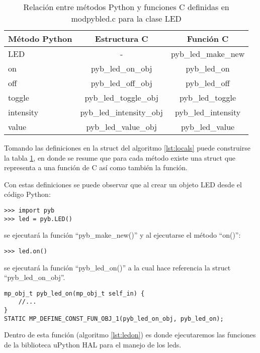 \begin{table}[h]
	\centering
	\caption[]{Relación entre métodos Python y funciones C definidas en modpybled.c para la clase LED}
	\begin{tabular}{l c c}    
		\toprule
		\textbf{Método Python} 	 & \textbf{Estructura C} & \textbf{Función C}  \\
		\midrule
		LED	 				& - 												& pyb\_led\_make\_new \\	
		on	 				& pyb\_led\_on\_obj 				& pyb\_led\_on 					\\		
		off 	 			& pyb\_led\_off\_obj 				& pyb\_led\_off					\\
		toggle	 		& pyb\_led\_toggle\_obj 		& pyb\_led\_toggle			\\
		intensity	 	& pyb\_led\_intensity\_obj 	& pyb\_led\_intensity		\\
		value	 			& pyb\_led\_value\_obj 			&	pyb\_led\_value 			\\
		\bottomrule
		\hline
	\end{tabular}
	\label{tab:methfn}
\end{table}

Tomando las definiciones en la struct del algoritmo \ref{lst:locals} puede construirse la tabla \ref{tab:methfn}, en donde se resume que para cada método existe una struct que representa a una función de C así como también la función.

Con estas definiciones se puede observar que al crear un objeto LED desde el código Python:
\begin{verbatim}
>>> import pyb
>>> led = pyb.LED()
\end{verbatim}

se ejecutará la función “pyb\_make\_new()” y al ejecutarse el método “on()”:
\begin{verbatim}
>>> led.on()
\end{verbatim}

se ejecutará la función “pyb\_led\_on()” a la cual hace referencia la struct “pyb\_led\_on\_obj”.

\begin{lstlisting}[label={lst:ledon},caption=Función que se ejecuta al invocar el método on().] 
mp_obj_t pyb_led_on(mp_obj_t self_in) {
    //...
}
STATIC MP_DEFINE_CONST_FUN_OBJ_1(pyb_led_on_obj, pyb_led_on);
\end{lstlisting}

Dentro de esta función (algoritmo \ref{lst:ledon}) es donde ejecutaremos las funciones de la biblioteca uPython HAL para el manejo de los leds.

